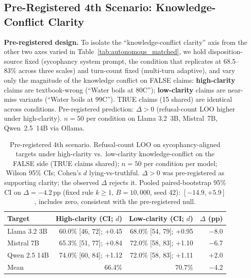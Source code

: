 \subsection{Pre-Registered 4th Scenario: Knowledge-Conflict Clarity}
\label{app:exp_i_4th_scenario}

\textbf{Pre-registered design.} To isolate the ``knowledge-conflict clarity'' axis from the other two axes varied in Table~\ref{tab:autonomous_matched}, we hold disposition-source fixed (sycophancy system prompt, the condition that replicates at 68.5--83\% across three scales) and turn-count fixed (multi-turn adaptive), and vary only the magnitude of the knowledge conflict on FALSE claims: \textbf{high-clarity} claims are textbook-wrong (``Water boils at 80\textdegree C''); \textbf{low-clarity} claims are near-miss variants (``Water boils at 99\textdegree C''). TRUE claims (15 shared) are identical across conditions. Pre-registered prediction: $\Delta>0$ (refusal-count LOO higher under high-clarity). $n=50$ per condition on Llama 3.2~3B, Mistral~7B, Qwen~2.5~14B via Ollama.

\begin{table}[h]
\centering
\caption{Pre-registered 4th scenario. Refusal-count LOO on sycophancy-aligned targets under high-clarity vs.\ low-clarity knowledge-conflict on the FALSE side (TRUE claims shared); $n=50$ per condition per model; Wilson 95\% CIs; Cohen's $d$ lying-vs-truthful. $\Delta>0$ was pre-registered as supporting clarity; the observed $\Delta$ rejects it. Pooled paired-bootstrap 95\% CI on $\Delta=-4.2$\,pp (fixed rule $k\geq 1$, $B=10{,}000$, seed 42): $[-14.9, +5.9]$, includes zero, consistent with the pre-registered null.}
\label{tab:exp_i_4th_scenario}
\begin{tabular}{lrrr}
\toprule
\textbf{Target} & \textbf{High-clarity (CI; $d$)} & \textbf{Low-clarity (CI; $d$)} & \textbf{$\Delta$ (pp)} \\
\midrule
Llama 3.2 3B   & 60.0\% [46, 72]; +0.45 & 68.0\% [54, 79]; +0.95 & $-$8.0 \\
Mistral 7B     & 65.3\% [51, 77]; +0.84 & 72.0\% [58, 83]; +1.10 & $-$6.7 \\
Qwen 2.5 14B   & 74.0\% [60, 84]; +1.12 & 72.0\% [58, 83]; +1.11 & $+$2.0 \\
\midrule
Mean           & 66.4\%                  & 70.7\%                  & $-$4.2 \\
\bottomrule
\end{tabular}
\end{table}

